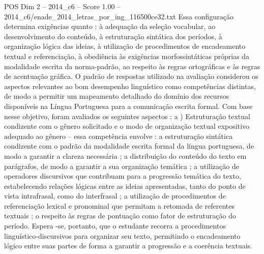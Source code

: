 \begin{textsample}{POS Dim 2 – 2014\_c6 – Score 1.00 – 2014\_c6/enade\_2014\_letras\_por\_ing\_116500ce32.txt}
Essa configuração determina exigências quanto : à adequação da seleção vocabular, ao desenvolvimento do conteúdo, à estruturação sintática dos períodos, à organização lógica das ideias, à utilização de procedimentos de encadeamento textual e referenciação, à obediência às exigências morfossintáticas próprias da modalidade escrita da norma-padrão, ao respeito às regras ortográficas e às regras de acentuação gráfica.
O padrão de respostas utilizado na avaliação considerou os aspectos relevantes ao bom desempenho linguístico como competências distintas, de modo a permitir um mapeamento detalhado do domínio dos recursos disponíveis na Língua Portuguesa para a comunicação escrita formal.
Com base nesse objetivo, foram avaliados os seguintes aspectos : a ) Estruturação textual condizente com o gênero solicitado e o modo de organização textual expositivo adequado ao gênero – essa competência envolve : a estruturação sintática condizente com o padrão da modalidade escrita formal da língua portuguesa, de modo a garantir a clareza necessária ; a distribuição do conteúdo do texto em parágrafos, de modo a garantir a sua organização temática ; a utilização de operadores discursivos que contribuam para a progressão temática do texto, estabelecendo relações lógicas entre as ideias apresentadas, tanto do ponto de vista intrafrasal, como do interfrasal ; a utilização de procedimentos de referenciação lexical e pronominal que permitam a retomada de referentes textuais ; o respeito às regras de pontuação como fator de estruturação do período.
Espera -se, portanto, que o estudante recorra a procedimentos linguístico-discursivos para organizar seu texto, permitindo o encadeamento lógico entre suas partes de forma a garantir a progressão e a coerência textuais.

\end{textsample}
